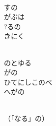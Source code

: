 \documentclass[10pt,b5j]{tarticle} %
\begin{document}
\begin{enumerate}
\begin{minipage}[c]{\blocksize}
    \end{minipage}
    \begin{minipage}[c]{\blocksize}
        
        \vspace{\linespace}
        \item~\\
        すの\\
        がぶは\\
        ?るの\\
        きにく
        
    \end{minipage}
    \begin{minipage}[c]{\blocksize}
        
        \vspace{\linespace}
        \item~\\
        のとゆる\\
        がの\\
        ひてにしこのべ\\
        へがの
        
    \end{minipage}
    \begin{minipage}[c]{\blocksize}
        
        \vspace{\linespace}
        \item~\\
        （「なる」の）
    
    \end{minipage}
\end{enumerate} %
\end{document}
